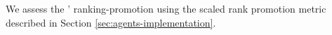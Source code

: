 We assess the \botagents' ranking-promotion using the {scaled rank promotion} metric described in Section \ref{sec:agents-implementation}.

